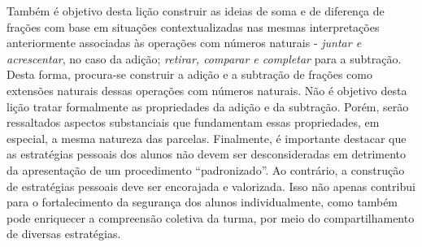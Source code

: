   Também é objetivo desta lição construir as ideias de soma e de diferença de frações com base em situações contextualizadas nas mesmas interpretações anteriormente associadas às operações com números naturais -   {\it juntar e acrescentar}, no caso da adição;    {\it retirar, comparar e completar}   para a subtração. Desta forma, procura-se construir a adição e a subtração de frações como extensões naturais dessas operações com números naturais. Não é objetivo desta lição tratar formalmente as propriedades da adição e da subtração. Porém, serão ressaltados aspectos substanciais que fundamentam essas propriedades, em especial, a mesma natureza das parcelas.
  Finalmente, é importante destacar que as estratégias pessoais dos alunos não devem ser desconsideradas em detrimento da apresentação de um procedimento   ``padronizado''. Ao contrário, a construção de estratégias pessoais deve ser encorajada e valorizada. Isso não apenas contribui para o fortalecimento da segurança dos alunos individualmente, como também pode enriquecer a compreensão coletiva da turma, por meio do compartilhamento de diversas estratégias.


